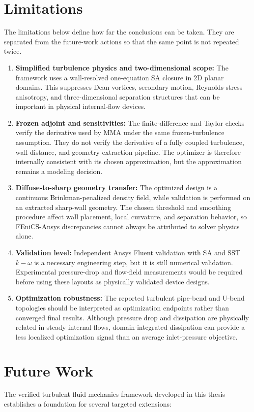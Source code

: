 \section{Limitations}
The limitations below define how far the conclusions can be taken. They are separated from the future-work actions so that the same point is not repeated twice.
\begin{enumerate}
	\item \textbf{Simplified turbulence physics and two-dimensional scope:} The framework uses a wall-resolved one-equation SA closure in 2D planar domains. This suppresses Dean vortices, secondary motion, Reynolds-stress anisotropy, and three-dimensional separation structures that can be important in physical internal-flow devices.
	\item \textbf{Frozen adjoint and sensitivities:} The finite-difference and Taylor checks verify the derivative used by MMA under the same frozen-turbulence assumption. They do not verify the derivative of a fully coupled turbulence, wall-distance, and geometry-extraction pipeline. The optimizer is therefore internally consistent with its chosen approximation, but the approximation remains a modeling decision.
	\item \textbf{Diffuse-to-sharp geometry transfer:} The optimized design is a continuous Brinkman-penalized density field, while validation is performed on an extracted sharp-wall geometry. The chosen threshold and smoothing procedure affect wall placement, local curvature, and separation behavior, so FEniCS-Ansys discrepancies cannot always be attributed to solver physics alone.
	\item \textbf{Validation level:} Independent Ansys Fluent validation with SA and SST $k-\omega$ is a necessary engineering step, but it is still numerical validation. Experimental pressure-drop and flow-field measurements would be required before using these layouts as physically validated device designs.
	\item \textbf{Optimization robustness:} The reported turbulent pipe-bend and U-bend topologies should be interpreted as optimization endpoints rather than converged final results. Although pressure drop and dissipation are physically related in steady internal flows, domain-integrated dissipation can provide a less localized optimization signal than an average inlet-pressure objective.
\end{enumerate}

\section{Future Work}
The verified turbulent fluid mechanics framework developed in this thesis establishes a foundation for several targeted extensions:

